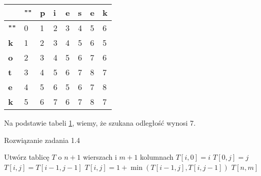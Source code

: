 \begin{table}[H]
	\center
	\begin{tabular}{|l|lllllll|}
		\hline \diagbox{$y$}{$x$}
		& \multicolumn{1}{l|}{\textbf{""}} & \multicolumn{1}{l|}{\textbf{p}} & \multicolumn{1}{l|}{\textbf{i}} & \multicolumn{1}{l|}{\textbf{e}} & \multicolumn{1}{l|}{\textbf{s}} & \multicolumn{1}{l|}{\textbf{e}} & \multicolumn{1}{l|}{\textbf{k}} \\ \hline
		\textbf{""} & 0 & 1 & 2 & 3 & 4 & 5 & 6 \\ \cline{1-1}
		\textbf{k}  & 1 & 2 & 3 & 4 & 5 & 6 & 5 \\ \cline{1-1}
		\textbf{o}  & 2 & 3 & 4 & 5 & 6 & 7 & 6 \\ \cline{1-1}
		\textbf{t}  & 3 & 4 & 5 & 6 & 7 & 8 & 7 \\ \cline{1-1}
		\textbf{e}  & 4 & 5 & 6 & 5 & 6 & 7 & 8 \\ \cline{1-1}
		\textbf{k}  & 5 & 6 & 7 & 6 & 7 & 8 & 7 \\ \cline{1-1}
		\hline
	\end{tabular}
	\caption{}
	\label{tab_zad14}
\end{table}

Na podstawie tabeli \ref{tab_zad14}, wiemy, że szukana odległość wynosi 7.

\begin{algorithm}[H]
	\caption{Rozwiązanie zadania 1.4}
	\begin{algorithmic}[1]
		\State Utwórz tablicę $T$ o $n + 1$ wierszach i $m + 1$ kolumnach
		\State $T[i, 0] = i$
		\EndFor		
		\State $T[0, j] = j$
		\EndFor
		\State $T[i, j] = T[i - 1, j - 1]$
		\Else
		\State $T[i, j] = 1 + \min(T[i - 1, j], T[i, j - 1])$
		\EndIf
		\EndFor
		\EndFor
		\State \Return $T[n, m]$
		\EndProcedure 
	\end{algorithmic}
	\label{Zadanie14}
\end{algorithm}

